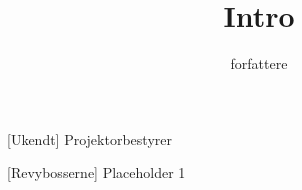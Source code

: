 \documentclass[a4paper,11pt]{article}
\title{Intro}
\author{forfattere}
\begin{document}
\maketitle

\begin{roles}
[Ukendt]  Projektorbestyrer
\end{roles}

\begin{props}
[Revybosserne] Placeholder 1
\end{props}

  
\begin{sketch}

\end{sketch}
\end{document}

